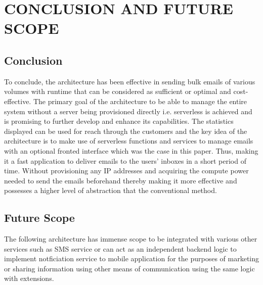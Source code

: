 \chapter{CONCLUSION AND FUTURE SCOPE}
\label{ch:conclusion}

\section{Conclusion}
To conclude, the architecture has been effective in sending bulk emails of various volumes with runtime that can be considered as sufficient or optimal and cost-effective. The primary goal of the architecture to be able to manage the entire system without a server being provisioned directly i.e. serverless is achieved and is promising to further develop and enhance its capabilities. The statistics displayed can be used for reach through the customers and the key idea of the architecture is to make use of serverless functions and services to manage emails with an optional fronted interface which was the case in this paper. Thus, making it a fast application to deliver emails to the users’ inboxes in a short period of time. Without provisioning any IP addresses and acquiring the compute power needed to send the emails beforehand thereby making it more effective and possesses a higher level of abstraction that the conventional method.

\section{Future Scope}

The following architecture has immense scope to be integrated with various other services such as SMS service or can act as an independent backend logic to implement notficiation service to mobile application for the purposes of marketing or sharing information using other means of communication using the same logic with extensions.
